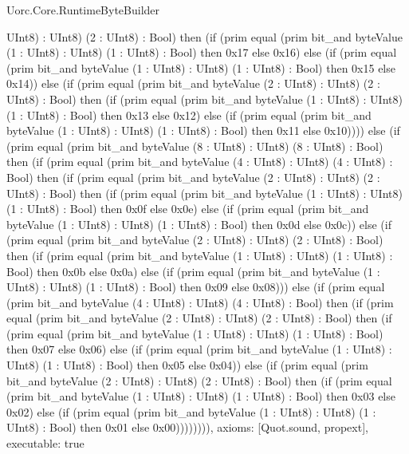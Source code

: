 \begin{lexlean}{Uorc.Core.RuntimeByteBuilder}
\begin{semanticmodule}
{UInt8) : UInt8) (2 : UInt8) : Bool) then (if (prim equal (prim bit_and byteValue (1 : UInt8) : UInt8) (1 : UInt8) : Bool) then 0x17 else 0x16) else (if (prim equal (prim bit_and byteValue (1 : UInt8) : UInt8) (1 : UInt8) : Bool) then 0x15 else 0x14)) else (if (prim equal (prim bit_and byteValue (2 : UInt8) : UInt8) (2 : UInt8) : Bool) then (if (prim equal (prim bit_and byteValue (1 : UInt8) : UInt8) (1 : UInt8) : Bool) then 0x13 else 0x12) else (if (prim equal (prim bit_and byteValue (1 : UInt8) : UInt8) (1 : UInt8) : Bool) then 0x11 else 0x10)))) else (if (prim equal (prim bit_and byteValue (8 : UInt8) : UInt8) (8 : UInt8) : Bool) then (if (prim equal (prim bit_and byteValue (4 : UInt8) : UInt8) (4 : UInt8) : Bool) then (if (prim equal (prim bit_and byteValue (2 : UInt8) : UInt8) (2 : UInt8) : Bool) then (if (prim equal (prim bit_and byteValue (1 : UInt8) : UInt8) (1 : UInt8) : Bool) then 0x0f else 0x0e) else (if (prim equal (prim bit_and byteValue (1 : UInt8) : UInt8) (1 : UInt8) : Bool) then 0x0d else 0x0c)) else (if (prim equal (prim bit_and byteValue (2 : UInt8) : UInt8) (2 : UInt8) : Bool) then (if (prim equal (prim bit_and byteValue (1 : UInt8) : UInt8) (1 : UInt8) : Bool) then 0x0b else 0x0a) else (if (prim equal (prim bit_and byteValue (1 : UInt8) : UInt8) (1 : UInt8) : Bool) then 0x09 else 0x08))) else (if (prim equal (prim bit_and byteValue (4 : UInt8) : UInt8) (4 : UInt8) : Bool) then (if (prim equal (prim bit_and byteValue (2 : UInt8) : UInt8) (2 : UInt8) : Bool) then (if (prim equal (prim bit_and byteValue (1 : UInt8) : UInt8) (1 : UInt8) : Bool) then 0x07 else 0x06) else (if (prim equal (prim bit_and byteValue (1 : UInt8) : UInt8) (1 : UInt8) : Bool) then 0x05 else 0x04)) else (if (prim equal (prim bit_and byteValue (2 : UInt8) : UInt8) (2 : UInt8) : Bool) then (if (prim equal (prim bit_and byteValue (1 : UInt8) : UInt8) (1 : UInt8) : Bool) then 0x03 else 0x02) else (if (prim equal (prim bit_and byteValue (1 : UInt8) : UInt8) (1 : UInt8) : Bool) then 0x01 else 0x00)))))))),
  axioms: [Quot.sound, propext],
  executable: true
}


\end{semanticmodule}
\end{lexlean}
